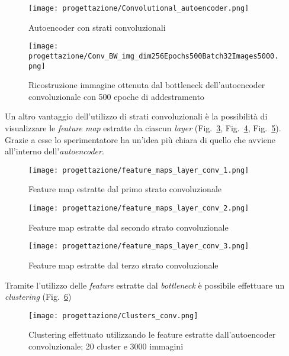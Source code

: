 \begin{figure}[!h] 
  \centering 
  \texttt{[image: progettazione/Convolutional\_autoencoder.png]} 
  \caption{Autoencoder con strati convoluzionali}
  \label{fig:schema-conv}
\end{figure}


\begin{figure}[!h] 
  \centering 
  \texttt{[image: progettazione/Conv\_BW\_img\_dim256Epochs500Batch32Images5000.png]} 
  \caption{Ricostruzione immagine ottenuta dal bottleneck dell'autoencoder convoluzionale con 500 epoche di addestramento}
  \label{fig:conv-ricostruita}
\end{figure}

Un altro vantaggio dell'utilizzo di strati convoluzionali è la possibilità di visualizzare le \emph{feature map} estratte da ciascun \emph{layer} (Fig.~\ref{fig:conv-1}, Fig.~\ref{fig:conv-2}, Fig.~\ref{fig:conv-3}). Grazie a esse lo sperimentatore ha un'idea più chiara di quello che avviene all'interno dell'\emph{autoencoder}.


\begin{figure}[!htbp] 
  \centering 
  \texttt{[image: progettazione/feature\_maps\_layer\_conv\_1.png]} 
  \caption{Feature map estratte dal primo strato convoluzionale}
  \label{fig:conv-1}
\end{figure}

\newpage

\begin{figure}[!htbp] 
  \centering 
  \texttt{[image: progettazione/feature\_maps\_layer\_conv\_2.png]} 
  \caption{Feature map estratte dal secondo strato convoluzionale}
  \label{fig:conv-2}
\end{figure}

\begin{figure}[!htbp] 
  \centering 
  \texttt{[image: progettazione/feature\_maps\_layer\_conv\_3.png]} 
  \caption{Feature map estratte dal terzo strato convoluzionale}
  \label{fig:conv-3}
\end{figure}

\newpage
Tramite l'utilizzo delle \emph{\gls{feature}} estratte dal \emph{bottleneck} è possibile effettuare un \emph{clustering} (Fig.~\ref{fig:cluster-conv})


\begin{figure}[!htbp] 
  \centering 
  \texttt{[image: progettazione/Clusters\_conv.png]} 
  \caption{Clustering effettuato utilizzando le \gls{feature} estratte dall'autoencoder convoluzionale; 20 cluster e 3000 immagini}
  \label{fig:cluster-conv}
\end{figure}

